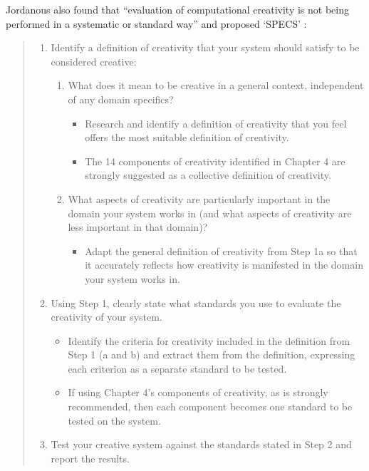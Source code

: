 Jordanous also found that ``evaluation of computational creativity is not being performed in a systematic or standard way'' \autocite*{Jordanous2011} and proposed `\ac{SPECS}' \autocite*{Jordanous2012a}:

\begin{quotation}
  \begin{enumerate}
    \item Identify a definition of creativity that your system should satisfy to be considered creative:
      \begin{enumerate}
        \item What does it mean to be creative in a general context, independent of any domain specifics?
        \begin{itemize}
          \item Research and identify a definition of creativity that you feel offers the most suitable definition of creativity.
          \item The 14 components of creativity identified in Chapter 4 are strongly suggested as a collective definition of creativity.
        \end{itemize}
        \item What aspects of creativity are particularly important in the domain your system works in (and what aspects of creativity are less important in that domain)?
        \begin{itemize}
          \item Adapt the general definition of creativity from Step 1a so that it accurately reflects how creativity is manifested in the domain your system works in.
        \end{itemize}
      \end{enumerate}
    \item Using Step 1, clearly state what standards you use to evaluate the creativity of your system.
      \begin{itemize}
        \item Identify the criteria for creativity included in the definition from Step 1 (a and b) and extract them from the definition, expressing each criterion as a separate standard to be tested.
        \item If using Chapter 4's components of creativity, as is strongly recommended, then each component becomes one standard to be tested on the system.
      \end{itemize}
    \item Test your creative system against the standards stated in Step 2 and report the results.

\end{enumerate}
\end{quotation}

